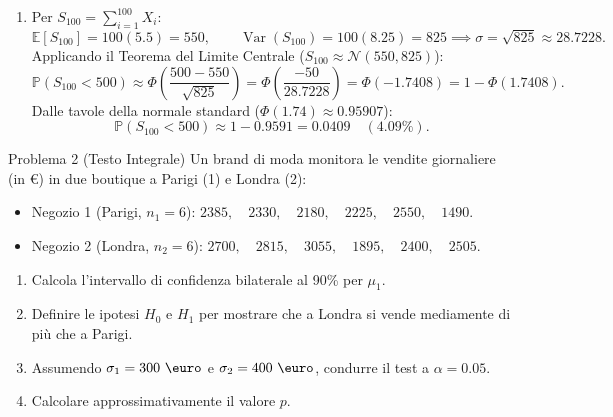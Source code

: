 \documentclass[11pt,a4paper]{article}
\newcommand{\EE}{\mathbb{E}}
\newcommand{\Prob}{\mathbb{P}}
\newcommand{\Var}{\operatorname{Var}}
\begin{document}
\begin{soluzionebox}
\begin{enumerate}[label=(\alph*)]
    \item Per $S_{100} = \sum_{i=1}^{100} X_i$:
    \[
    \EE[S_{100}] = 100(5.5) = 550, \qquad \Var(S_{100}) = 100(8.25) = 825 \implies \sigma = \sqrt{825} \approx 28.7228.
    \]
    Applicando il Teorema del Limite Centrale ($S_{100} \approx \mathcal{N}(550, 825)$):
    \[
    \Prob(S_{100} < 500) \approx \Phi\left( \frac{500 - 550}{\sqrt{825}} \right) = \Phi\left( \frac{-50}{28.7228} \right) = \Phi(-1.7408) = 1 - \Phi(1.7408).
    \]
    Dalle tavole della normale standard ($\Phi(1.74) \approx 0.95907$):
    \[
    \Prob(S_{100} < 500) \approx 1 - 0.9591 = \mathbf{0.0409} \quad (\mathbf{4.09\%}).
    \]
\end{enumerate}
\end{soluzionebox}

\begin{problemabox}{Problema 2 (Testo Integrale)}
Un brand di moda monitora le vendite giornaliere (in \euro) in due boutique a Parigi (1) e Londra (2):
\begin{itemize}
    \item Negozio 1 (Parigi, $n_1 = 6$): $2385, \quad 2330, \quad 2180, \quad 2225, \quad 2550, \quad 1490$.
    \item Negozio 2 (Londra, $n_2 = 6$): $2700, \quad 2815, \quad 3055, \quad 1895, \quad 2400, \quad 2505$.
\end{itemize}
\begin{enumerate}[label=(\alph*)]
    \item Calcola l'intervallo di confidenza bilaterale al 90\% per $\mu_1$.
    \item Definire le ipotesi $H_0$ e $H_1$ per mostrare che a Londra si vende mediamente di più che a Parigi.
    \item Assumendo $\sigma_1 = 300\text{ \euro}$ e $\sigma_2 = 400\text{ \euro}$, condurre il test a $\alpha = 0.05$.
    \item Calcolare approssimativamente il valore $p$.
\end{enumerate}
\end{problemabox}
\end{document}

